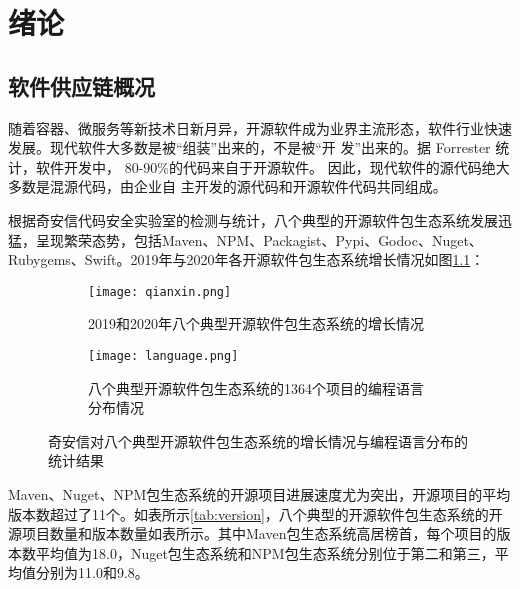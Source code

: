 
\chapter{绪论}

\section{软件供应链概况}
随着容器、微服务等新技术日新月异，开源软件成为业界主流形态，软件行业快速发展。现代软件大多数是被“组装”出来的，不是被“开
发”出来的。据 Forrester 统计，软件开发中， 80-90\%的代码来自于开源软件。 因此，现代软件的源代码绝大多数是混源代码，由企业自
主开发的源代码和开源软件代码共同组成。

根据奇安信代码安全实验室的检测与统计\cite{qianxin.com}，八个典型的开源软件包生态系统发展迅猛，呈现繁荣态势，包括Maven、NPM、Packagist、Pypi、Godoc、Nuget、Rubygems、Swift。2019年与2020年各开源软件包生态系统增长情况如图\ref{fig:qianxin}：


\begin{figure}[!htp]
  \centering
  \begin{subfigure}{0.4\textwidth}
    \centering
    \texttt{[image: qianxin.png]}
    \caption{2019和2020年八个典型开源软件包生态系统的增长情况}
	\label{fig:qianxin}
  \end{subfigure}
  \hspace{1cm}
  \begin{subfigure}{0.3\textwidth}
    \centering
    \texttt{[image: language.png]}
    \caption{八个典型开源软件包生态系统的1364个项目的编程语言分布情况}
	\label{fig:language}
  \end{subfigure}
  \caption{奇安信对八个典型开源软件包生态系统的增长情况与编程语言分布的统计结果}
  \label{fig:subfigure}
\end{figure}

Maven、Nuget、NPM包生态系统的开源项目进展速度尤为突出，开源项目的平均版本数超过了11个。如表所示\ref{tab:version}，八个典型的开源软件包生态系统的开源项目数量和版本数量如表所示。其中Maven包生态系统高居榜首，每个项目的版本数平均值为18.0，Nuget包生态系统和NPM包生态系统分别位于第二和第三，平均值分别为11.0和9.8\cite{qianxin.com}。

